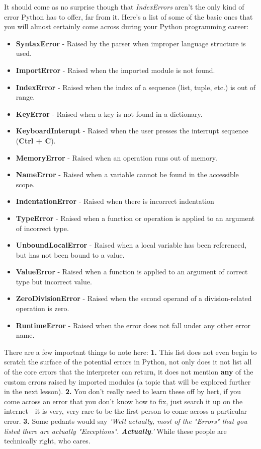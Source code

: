\documentclass{article}
\begin{document}
It should come as no surprise though that \textit{IndexErrors} aren't the only kind of error Python has to offer, far from it. Here's a list of some of the basic ones that you will almost certainly come across during your Python programming career:

\begin{itemize}
    \item \textbf{SyntaxError} - Raised by the parser when improper language structure is used.
    \item \textbf{ImportError} - Raised when the imported module is not found.
    \item \textbf{IndexError} - Raised when the index of a sequence (list, tuple, etc.) is out of range.
    \item \textbf{KeyError} - Raised when a key is not found in a dictionary.
    \item \textbf{KeyboardInterupt} - Raised when the user presses the interrupt sequence (\textbf{Ctrl + C}).
    \item \textbf{MemoryError} - Raised when an operation runs out of memory.
    \item \textbf{NameError} - Raised when a variable cannot be found in the accessible scope.
    \item \textbf{IndentationError} - Raised when there is incorrect indentation
    \item \textbf{TypeError} - Raised when a function or operation is applied to an argument of incorrect type.
    \item \textbf{UnboundLocalError} - Raised when a local variable has been referenced, but has not been bound to a value.
    \item \textbf{ValueError} - Raised when a function is applied to an argument of correct type but incorrect value.
    \item \textbf{ZeroDivisionError} - Raised when the second operand of a division-related operation is zero.
    \item \textbf{RuntimeError} - Raised when the error does not fall under any other error name.
\end{itemize}
There are a few important things to note here: \textbf{1.} This list does not even begin to scratch the surface of the potential errors in Python, not only does it not list all of the core errors that the interpreter can return, it does not mention \textbf{any} of the custom errors raised by imported modules (a topic that will be explored further in the next lesson). \textbf{2.} You don't really need to learn these off by hert, if you come across an error that you don't know how to fix, just search it up on the internet - it is very, very rare to be the first person to come across a particular error. \textbf{3.} Some pedants would say \textit{'Well actually, most of the "Errors" that you listed there are actually "Exceptions". \textbf{Actually}.'} While these people are technically right, who cares.
\end{document}
